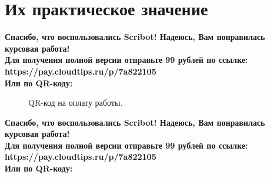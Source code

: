\documentclass{article}
\begin{document}
\section{Их практическое значение}
\begin{center}
    \textbf{
        Спасибо, что воспользовались Scribot! Надеюсь, Вам понравилась курсовая работа!\\
        Для получения полной версии отправьте 99 рублей по ссылке:\\
        https://pay.cloudtips.ru/p/7a822105\\
        Или по QR-коду:\\
    }
\end{center}
\begin{figure}[h]
    \caption{QR-код на оплату работы.}
    \label{ris:image}
\end{figure}
\newpage
\begin{center}
    \textbf{
        Спасибо, что воспользовались Scribot! Надеюсь, Вам понравилась курсовая работа!\\
        Для получения полной версии отправьте 99 рублей по ссылке:\\
        https://pay.cloudtips.ru/p/7a822105\\
        Или по QR-коду:\\
    }
\end{center}
\end{document}

